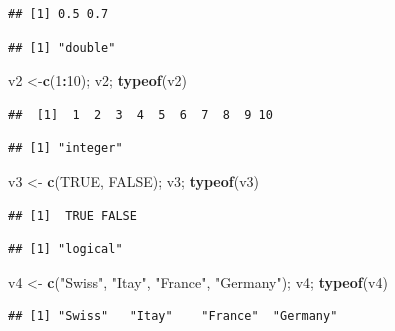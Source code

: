 \documentclass[
]{article}
\newenvironment{Shaded}{\begin{snugshade}}{\end{snugshade}}
\newcommand{\ConstantTok}[1]{\textcolor[rgb]{0.56,0.35,0.01}{#1}}
\newcommand{\DecValTok}[1]{\textcolor[rgb]{0.00,0.00,0.81}{#1}}
\newcommand{\FunctionTok}[1]{\textcolor[rgb]{0.13,0.29,0.53}{\textbf{#1}}}
\newcommand{\NormalTok}[1]{#1}
\newcommand{\OtherTok}[1]{\textcolor[rgb]{0.56,0.35,0.01}{#1}}
\newcommand{\SpecialCharTok}[1]{\textcolor[rgb]{0.81,0.36,0.00}{\textbf{#1}}}
\newcommand{\StringTok}[1]{\textcolor[rgb]{0.31,0.60,0.02}{#1}}
\begin{document}
\begin{verbatim}
## [1] 0.5 0.7
\end{verbatim}

\begin{verbatim}
## [1] "double"
\end{verbatim}

\begin{Shaded}
\begin{Highlighting}[]
\NormalTok{v2 }\OtherTok{\textless{}{-}}\FunctionTok{c}\NormalTok{(}\DecValTok{1}\SpecialCharTok{:}\DecValTok{10}\NormalTok{); v2; }\FunctionTok{typeof}\NormalTok{(v2)}
\end{Highlighting}
\end{Shaded}

\begin{verbatim}
##  [1]  1  2  3  4  5  6  7  8  9 10
\end{verbatim}

\begin{verbatim}
## [1] "integer"
\end{verbatim}

\begin{Shaded}
\begin{Highlighting}[]
\NormalTok{v3 }\OtherTok{\textless{}{-}} \FunctionTok{c}\NormalTok{(}\ConstantTok{TRUE}\NormalTok{, }\ConstantTok{FALSE}\NormalTok{); v3; }\FunctionTok{typeof}\NormalTok{(v3)}
\end{Highlighting}
\end{Shaded}

\begin{verbatim}
## [1]  TRUE FALSE
\end{verbatim}

\begin{verbatim}
## [1] "logical"
\end{verbatim}

\begin{Shaded}
\begin{Highlighting}[]
\NormalTok{v4 }\OtherTok{\textless{}{-}} \FunctionTok{c}\NormalTok{(}\StringTok{"Swiss"}\NormalTok{, }\StringTok{"Itay"}\NormalTok{, }\StringTok{"France"}\NormalTok{, }\StringTok{"Germany"}\NormalTok{); v4; }\FunctionTok{typeof}\NormalTok{(v4)}
\end{Highlighting}
\end{Shaded}

\begin{verbatim}
## [1] "Swiss"   "Itay"    "France"  "Germany"
\end{verbatim}
\end{document}
